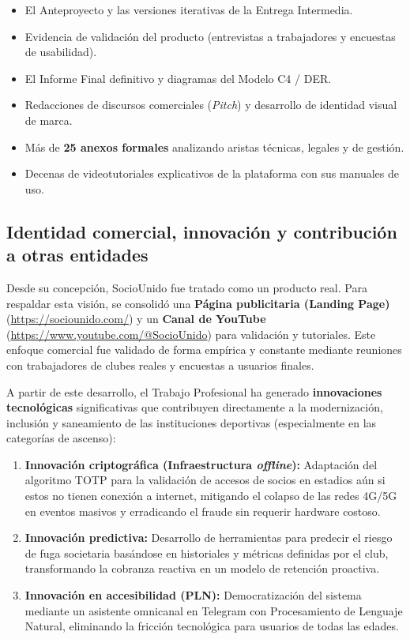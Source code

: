 \begin{itemize}
    \item El Anteproyecto y las versiones iterativas de la Entrega Intermedia.
    \item Evidencia de validación del producto (entrevistas a trabajadores y encuestas de usabilidad).
    \item El Informe Final definitivo y diagramas del Modelo C4 / DER.
    \item Redacciones de discursos comerciales (\textit{Pitch}) y desarrollo de identidad visual de marca.
    \item Más de \textbf{25 anexos formales} analizando aristas técnicas, legales y de gestión.
    \item Decenas de videotutoriales explicativos de la plataforma con sus manuales de uso.
\end{itemize}

\subsection{Identidad comercial, innovación y contribución a otras entidades}

Desde su concepción, SocioUnido fue tratado como un producto real. Para respaldar esta visión, se consolidó una \textbf{Página publicitaria (Landing Page)} (\url{https://sociounido.com/}) y un \textbf{Canal de YouTube} (\url{https://www.youtube.com/@SocioUnido}) para validación y tutoriales. Este enfoque comercial fue validado de forma empírica y constante mediante reuniones con trabajadores de clubes reales y encuestas a usuarios finales.

A partir de este desarrollo, el Trabajo Profesional ha generado \textbf{innovaciones tecnológicas} significativas que contribuyen directamente a la modernización, inclusión y saneamiento de las instituciones deportivas (especialmente en las categorías de ascenso):
\begin{enumerate}
    \item \textbf{Innovación criptográfica (Infraestructura \textit{offline}):} Adaptación del algoritmo TOTP para la validación de accesos de socios en estadios aún si estos no tienen conexión a internet, mitigando el colapso de las redes 4G/5G en eventos masivos y erradicando el fraude sin requerir hardware costoso.
    \item \textbf{Innovación predictiva:} Desarrollo de herramientas para predecir el riesgo de fuga societaria basándose en historiales y métricas definidas por el club, transformando la cobranza reactiva en un modelo de retención proactiva.
    \item \textbf{Innovación en accesibilidad (PLN):} Democratización del sistema mediante un asistente omnicanal en Telegram con Procesamiento de Lenguaje Natural, eliminando la fricción tecnológica para usuarios de todas las edades.
\end{enumerate}

